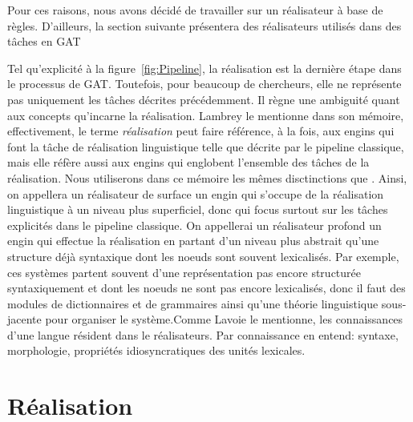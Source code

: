 Pour ces raisons, nous avons décidé de travailler sur un réalisateur à base de règles. D'ailleurs, la section suivante présentera des réalisateurs utilisés dans des tâches en \ac{GAT}

Tel qu'explicité à la figure~\ref{fig:Pipeline}, la réalisation est la dernière étape dans le processus de \ac{GAT}. Toutefois, pour beaucoup de chercheurs, elle ne représente pas uniquement les tâches décrites précédemment. Il règne une ambiguité quant aux concepts qu'incarne la réalisation. Lambrey le mentionne \citep{LambreyImplementationcollocationspour2017} dans son mémoire, effectivement, le terme \emph{réalisation} peut faire référence, à la fois, aux engins qui font la tâche de réalisation linguistique telle que décrite par le pipeline classique, mais elle réfère aussi aux engins qui englobent l'ensemble des tâches de la réalisation. Nous utiliserons dans ce mémoire les mêmes disctinctions que \citep{LambreyImplementationcollocationspour2017}. Ainsi, on appellera un réalisateur de surface un engin qui s'occupe de la réalisation linguistique à un niveau plus superficiel, donc qui focus surtout sur les tâches explicités dans le pipeline classique. On appellerai un réalisateur profond un engin qui effectue la réalisation en partant d'un niveau plus abstrait qu'une structure déjà syntaxique dont les noeuds sont souvent lexicalisés. Par exemple, ces systèmes partent souvent d'une représentation pas encore structurée syntaxiquement et dont les noeuds ne sont pas encore lexicalisés, donc il faut des modules de dictionnaires et de grammaires ainsi qu'une théorie linguistique sous-jacente pour organiser le système.Comme Lavoie le mentionne\citep{LavoieFastPortableRealizer1997}, les connaissances d'une langue résident dans le réalisateurs. Par connaissance en entend: syntaxe, morphologie, propriétés idiosyncratiques des unités lexicales. 




\section{Réalisation}

